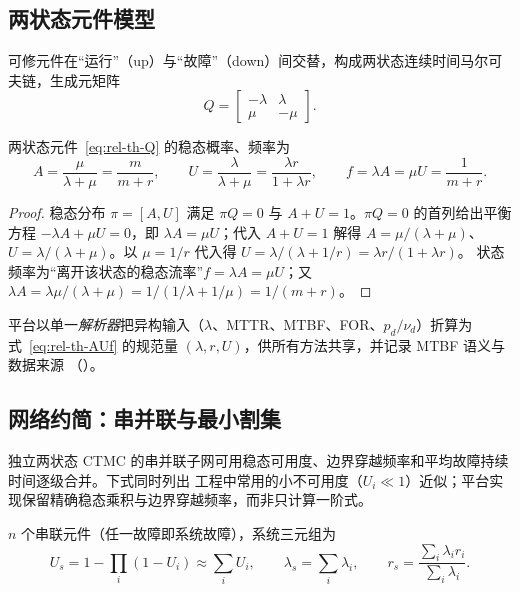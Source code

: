 \subsection{两状态元件模型}\label{sec:rel-th-twostate}\label{sec:rel-param}
可修元件在“运行”（up）与“故障”（down）间交替，构成两状态连续时间马尔可夫链，生成元矩阵
\begin{equation}
 Q=\begin{bmatrix}-\lambda & \lambda\\ \mu & -\mu\end{bmatrix}.
 \label{eq:rel-th-Q}
\end{equation}

\begin{theorem}[稳态可用度与频率]\label{thm:rel-th-avail}
两状态元件~\eqref{eq:rel-th-Q} 的稳态概率、频率为
\begin{equation}
 A=\frac{\mu}{\lambda+\mu}=\frac{m}{m+r},\qquad
 U=\frac{\lambda}{\lambda+\mu}=\frac{\lambda r}{1+\lambda r},\qquad
 f=\lambda A=\mu U=\frac{1}{m+r}.
 \label{eq:rel-th-AUf}
\end{equation}
\end{theorem}

\begin{proof}
稳态分布 $\pi=[A,U]$ 满足 $\pi Q=0$ 与 $A+U=1$。$\pi Q=0$ 的首列给出平衡方程
$-\lambda A+\mu U=0$，即 $\lambda A=\mu U$；代入 $A+U=1$ 解得 $A=\mu/(\lambda+\mu)$、
$U=\lambda/(\lambda+\mu)$。以 $\mu=1/r$ 代入得 $U=\lambda/(\lambda+1/r)=\lambda r/(1+\lambda r)$。
状态频率为“离开该状态的稳态流率”$f=\lambda A=\mu U$；又 $\lambda A=\lambda\mu/(\lambda+\mu)
\allowbreak=1/(1/\lambda+1/\mu)\allowbreak=1/(m+r)$。
\end{proof}

平台以单一\emph{解析器}把异构输入（$\lambda$、MTTR、MTBF、FOR、$p_d/\nu_d$）折算为
式~\eqref{eq:rel-th-AUf} 的规范量 $(\lambda,r,U)$，供所有方法共享，并记录 MTBF 语义与数据来源
（）。

\subsection{网络约简：串并联与最小割集}\label{sec:rel-th-network}
独立两状态 CTMC 的串并联子网可用稳态可用度、边界穿越频率和平均故障持续时间逐级合并。下式同时列出
工程中常用的小不可用度（$U_i\ll1$）近似；平台实现保留精确稳态乘积与边界穿越频率，而非只计算一阶式。

\begin{proposition}[串联合并]\label{prop:rel-th-series}
$n$ 个串联元件（任一故障即系统故障），系统三元组为
\begin{equation}
 U_s=1-\prod_i(1-U_i)\approx\sum_iU_i,\qquad
 \lambda_s=\sum_i\lambda_i,\qquad
 r_s=\frac{\sum_i\lambda_ir_i}{\sum_i\lambda_i}.
 \label{eq:rel-th-series}
\end{equation}
\end{proposition}

